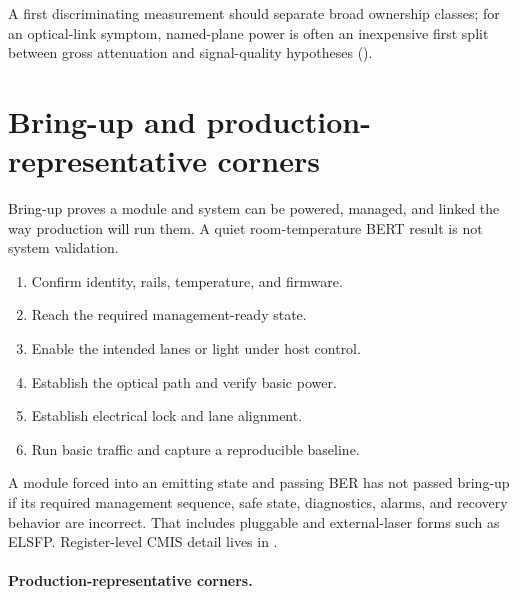A first discriminating measurement should separate broad ownership classes; for
an optical-link symptom, named-plane power is often an inexpensive first split
between gross attenuation and signal-quality hypotheses
().



\section{Bring-up and production-representative corners}
\label{sec:bringup}

Bring-up proves a module and system can be powered, managed, and linked the way
production will run them. A quiet room-temperature BERT result is not system
validation.

\begin{enumerate}
\item Confirm identity, rails, temperature, and firmware.
\item Reach the required management-ready state.
\item Enable the intended lanes or light under host control.
\item Establish the optical path and verify basic power.
\item Establish electrical lock and lane alignment.
\item Run basic traffic and capture a reproducible baseline.
\end{enumerate}

A module forced into an emitting state and passing BER has not passed bring-up
if its required management sequence, safe state, diagnostics, alarms, and
recovery behavior are incorrect. That includes pluggable and external-laser
forms such as
ELSFP.
Register-level CMIS detail lives in
.

\paragraph{Production-representative corners.}
\label{sec:prod-corners}

